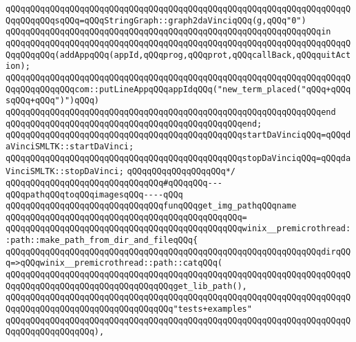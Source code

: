\verb|qQQqqQQqqQQqqQQqqQQqqQQqqQQqqQQqqQQqqQQqqQQqqQQqqQQqqQQqqQQqqQQqqQQqqQQqqQQqqQQqsqQQq=qQQqStringGraph::graph2daVinciqQQq(g,qQQq"0")|\newline
\verb|qQQqqQQqqQQqqQQqqQQqqQQqqQQqqQQqqQQqqQQqqQQqqQQqqQQqqQQqqQQqqQQqin|\newline
\verb|qQQqqQQqqQQqqQQqqQQqqQQqqQQqqQQqqQQqqQQqqQQqqQQqqQQqqQQqqQQqqQQqqQQqqQQqqQQqqQQq(addAppqQQq(appId,qQQqprog,qQQqprot,qQQqcallBack,qQQqquitAction);|\newline
\verb|qQQqqQQqqQQqqQQqqQQqqQQqqQQqqQQqqQQqqQQqqQQqqQQqqQQqqQQqqQQqqQQqqQQqqQQqqQQqqQQqqQQqcom::putLineAppqQQqappIdqQQq("new_term_placed("qQQq+qQQqsqQQq+qQQq")")qQQq)|\newline
\verb|qQQqqQQqqQQqqQQqqQQqqQQqqQQqqQQqqQQqqQQqqQQqqQQqqQQqqQQqqQQqqQQqend|\newline
\newline
\verb|qQQqqQQqqQQqqQQqqQQqqQQqqQQqqQQqqQQqqQQqqQQqqQQqend;|\newline
\newline
\verb|qQQqqQQqqQQqqQQqqQQqqQQqqQQqqQQqqQQqqQQqqQQqqQQqstartDaVinciqQQq=qQQqdaVinciSMLTK::startDaVinci;|\newline
\verb|qQQqqQQqqQQqqQQqqQQqqQQqqQQqqQQqqQQqqQQqqQQqqQQqstopDaVinciqQQq=qQQqdaVinciSMLTK::stopDaVinci;|\newline
\verb|qQQqqQQqqQQqqQQqqQQq*/|\newline
\newline
\verb|qQQqqQQqqQQqqQQqqQQqqQQqqQQqqQQq#qQQqqQQq---qQQqpathqQQqtoqQQqimagesqQQq----qQQq|\newline
\newline
\verb|qQQqqQQqqQQqqQQqqQQqqQQqqQQqqQQqfunqQQqget_img_pathqQQqname|\newline
\verb|qQQqqQQqqQQqqQQqqQQqqQQqqQQqqQQqqQQqqQQqqQQqqQQq=|\newline
\verb|qQQqqQQqqQQqqQQqqQQqqQQqqQQqqQQqqQQqqQQqqQQqqQQqwinix__premicrothread::path::make_path_from_dir_and_fileqQQq{|\newline
\verb|qQQqqQQqqQQqqQQqqQQqqQQqqQQqqQQqqQQqqQQqqQQqqQQqqQQqqQQqqQQqqQQqdirqQQq=>qQQqwinix__premicrothread::path::catqQQq(|\newline
\verb|qQQqqQQqqQQqqQQqqQQqqQQqqQQqqQQqqQQqqQQqqQQqqQQqqQQqqQQqqQQqqQQqqQQqqQQqqQQqqQQqqQQqqQQqqQQqqQQqqQQqqQQqget_lib_path(),|\newline
\verb|qQQqqQQqqQQqqQQqqQQqqQQqqQQqqQQqqQQqqQQqqQQqqQQqqQQqqQQqqQQqqQQqqQQqqQQqqQQqqQQqqQQqqQQqqQQqqQQqqQQqqQQq"tests+examples"|\newline
\verb|qQQqqQQqqQQqqQQqqQQqqQQqqQQqqQQqqQQqqQQqqQQqqQQqqQQqqQQqqQQqqQQqqQQqqQQqqQQqqQQqqQQqqQQq),|\newline
